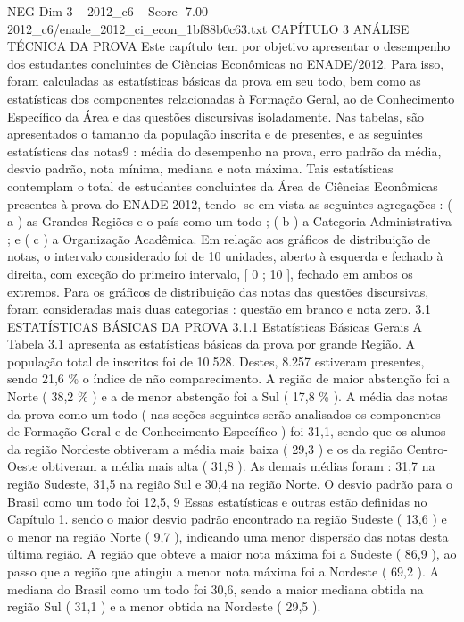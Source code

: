 \begin{textsample}{NEG Dim 3 – 2012\_c6 – Score -7.00 – 2012\_c6/enade\_2012\_ci\_econ\_1bf88b0c63.txt}  \label{ex:f3_neg_028}
CAPÍTULO 3 ANÁLISE TÉCNICA DA PROVA Este capítulo tem por objetivo apresentar o desempenho dos estudantes concluintes de Ciências Econômicas no ENADE/2012.
Para isso, foram calculadas as estatísticas básicas da prova em seu todo, bem como as estatísticas dos componentes relacionadas à Formação Geral, ao de Conhecimento Específico da Área e das questões discursivas isoladamente.
Nas tabelas, são apresentados o tamanho da população inscrita e de presentes, e as seguintes estatísticas das notas9 : média do desempenho na prova, erro padrão da média, desvio padrão, nota mínima, mediana e nota máxima.
Tais estatísticas contemplam o total de estudantes concluintes da Área de Ciências Econômicas presentes à prova do ENADE 2012, tendo -se em vista as seguintes agregações : ( a ) as Grandes Regiões e o país como um todo ; ( b ) a Categoria Administrativa ; e ( c ) a Organização Acadêmica.
Em relação aos gráficos de distribuição de notas, o intervalo considerado foi de 10 unidades, aberto à esquerda e fechado à direita, com exceção do primeiro intervalo, [ 0 ; 10 ], fechado em ambos os extremos.
Para os gráficos de distribuição das notas das questões discursivas, foram consideradas mais duas categorias : questão em branco e nota zero. 3.1 ESTATÍSTICAS BÁSICAS DA PROVA 3.1.1 Estatísticas Básicas Gerais A Tabela 3.1 apresenta as estatísticas básicas da prova por grande Região.
A população total de inscritos foi de 10.528.
Destes, 8.257 estiveram presentes, sendo 21,6 \% o índice de não comparecimento.
A região de maior abstenção foi a Norte ( 38,2 \% ) e a de menor abstenção foi a Sul ( 17,8 \% ).
A média das notas da prova como um todo ( nas seções seguintes serão analisados os componentes de Formação Geral e de Conhecimento Específico ) foi 31,1, sendo que os alunos da região Nordeste obtiveram a média mais baixa ( 29,3 ) e os da região Centro-Oeste obtiveram a média mais alta ( 31,8 ).
As demais médias foram : 31,7 na região Sudeste, 31,5 na região Sul e 30,4 na região Norte.
O desvio padrão para o Brasil como um todo foi 12,5, 9 Essas estatísticas e outras estão definidas no Capítulo 1. sendo o maior desvio padrão encontrado na região Sudeste ( 13,6 ) e o menor na região Norte ( 9,7 ), indicando uma menor dispersão das notas desta última região.
A região que obteve a maior nota máxima foi a Sudeste ( 86,9 ), ao passo que a região que atingiu a menor nota máxima foi a Nordeste ( 69,2 ).
A mediana do Brasil como um todo foi 30,6, sendo a maior mediana obtida na região Sul ( 31,1 ) e a menor obtida na Nordeste ( 29,5 ).

\end{textsample}
